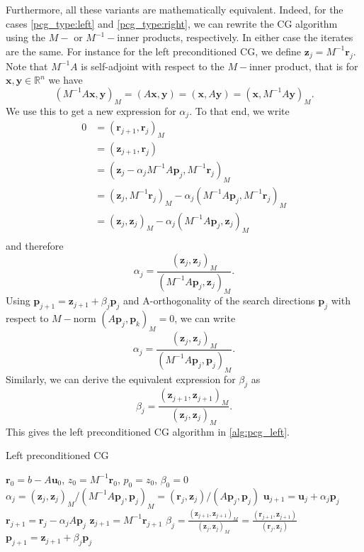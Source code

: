Furthermore, all these variants are mathematically equivalent. Indeed, for the cases \ref{pcg_type:left} and \ref{pcg_type:right}, we can rewrite the CG algorithm using the $M-$ or $M^{-1}-$inner products, respectively. In either case the iterates are the same. For instance for the left preconditioned CG, we define $\mathbf{z}_j = M^{-1}\mathbf{r}_j$. Note that $M^{-1}A$ is self-adjoint with respect to the $M-$inner product, that is for $\mathbf{x},\mathbf{y}\in\mathbb{R}^n$ we have
\[
  (M^{-1}A\mathbf{x}, \mathbf{y})_M = (A\mathbf{x}, \mathbf{y}) = (\mathbf{x}, A\mathbf{y}) = (\mathbf{x}, M^{-1}A\mathbf{y})_M.
\]
We use this to get a new expression for $\alpha_j$. To that end, we write
\begin{align*}
  0 & = (\mathbf{r}_{j+1}, \mathbf{r}_j)_M                                        \\
    & = (\mathbf{z}_{j+1}, \mathbf{r}_j)                                                   \\
    & = (\mathbf{z}_j - \alpha_j M^{-1}A\mathbf{p}_j, M^{-1}\mathbf{r}_j)_M                         \\
    & = (\mathbf{z}_j, M^{-1}\mathbf{r}_j)_M - \alpha_j (M^{-1}A\mathbf{p}_j, M^{-1}\mathbf{r}_j)_M \\
    & = (\mathbf{z}_j, \mathbf{z}_j)_M - \alpha_j (M^{-1}A\mathbf{p}_j, \mathbf{z}_j)_M                               \\
\end{align*}
and therefore
\[
  \alpha_j = \frac{(\mathbf{z}_j, \mathbf{z}_j)_M}{(M^{-1}A\mathbf{p}_j, \mathbf{z}_j)_M}.
\]
Using $\mathbf{p}_{j+1} = \mathbf{z}_{j+1} + \beta_j \mathbf{p}_j$ and A-orthogonality of the search directions $\mathbf{p}_j$ with respect to $M-$norm $(A\mathbf{p}_j, \mathbf{p}_k)_M = 0$, we can write
\[
  \alpha_j = \frac{(\mathbf{z}_j, \mathbf{z}_j)_M}{(M^{-1}A\mathbf{p}_j, \mathbf{p}_j)_M}.
\]
Similarly, we can derive the equivalent expression for $\beta_j$ as
\[
  \beta_j = \frac{(\mathbf{z}_{j+1}, \mathbf{z}_{j+1})_M}{(\mathbf{z}_j, \mathbf{z}_j)_M}.
\]
This gives the left preconditioned CG algorithm in \ref{alg:pcg_left}.
\begin{algorithm}[H]
  \caption{Left preconditioned CG \cite[Algorithm 9.1]{iter_method_saad}}
  \label{alg:pcg_left}
  \begin{algorithmic}
    \State $\mathbf{r}_0 = b - A\mathbf{u}_0$, $z_0 = M^{-1}\mathbf{r}_0$, $p_0 = z_0$, $\beta_0 = 0$
    \State $\alpha_j = (\mathbf{z}_j, \mathbf{z}_j)_M / (M^{-1}A\mathbf{p}_j, \mathbf{p}_j)_M = (\mathbf{r}_j, \mathbf{z}_j) / (A\mathbf{p}_j, \mathbf{p}_j)$
    \State $\mathbf{u}_{j+1} = \mathbf{u}_j + \alpha_j \mathbf{p}_j$
    \State $\mathbf{r}_{j+1} = \mathbf{r}_j - \alpha_j A \mathbf{p}_j$
    \State $\mathbf{z}_{j+1} = M^{-1}\mathbf{r}_{j+1}$
    \State $\beta_j = \frac{(\mathbf{z}_{j+1}, \mathbf{z}_{j+1})_M}{(\mathbf{z}_j, \mathbf{z}_j)_M} = \frac{(\mathbf{r}_{j+1}, \mathbf{z}_{j+1})}{(\mathbf{r}_j, \mathbf{z}_j)}$
    \State $\mathbf{p}_{j+1} = \mathbf{z}_{j+1} + \beta_j \mathbf{p}_j$
    \EndFor
  \end{algorithmic}
\end{algorithm}
